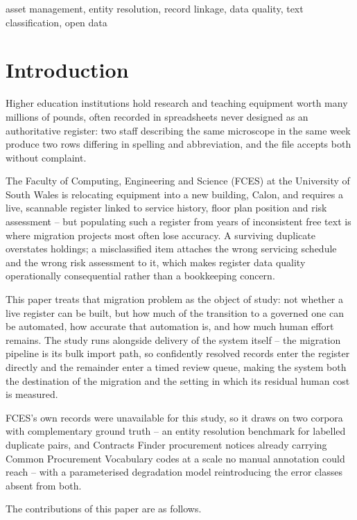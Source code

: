 \documentclass[conference]{IEEEtran}
\begin{document}
\begin{IEEEkeywords}
asset management, entity resolution, record linkage, data quality, text
classification, open data
\end{IEEEkeywords}

\section{Introduction}

Higher education institutions hold research and teaching equipment worth
many millions of pounds, often recorded in spreadsheets never designed as
an authoritative register: two staff describing the same microscope in
the same week produce two rows differing in spelling and abbreviation,
and the file accepts both without complaint.

The Faculty of Computing, Engineering and Science (FCES) at the
University of South Wales is relocating equipment into a new building,
Calon, and requires a live, scannable register linked to service
history, floor plan position and risk assessment -- but populating such
a register from years of inconsistent free text is where migration
projects most often lose accuracy. A surviving duplicate overstates
holdings; a misclassified item attaches the wrong servicing schedule
and the wrong risk assessment to it, which makes register data quality
operationally consequential rather than a bookkeeping concern.

This paper treats that migration problem as the object of study: not
whether a live register can be built, but how much of the transition to
a governed one can be automated, how accurate that automation is, and
how much human effort remains. The study runs alongside delivery of the
system itself -- the migration pipeline is its bulk import path, so
confidently resolved records enter the register directly and the
remainder enter a timed review queue, making the system both the
destination of the migration and the setting in which its residual
human cost is measured.

FCES's own records were unavailable for this study, so it draws on two
corpora with complementary ground truth -- an entity resolution
benchmark for labelled duplicate pairs, and Contracts Finder procurement
notices already carrying Common Procurement Vocabulary codes at a scale
no manual annotation could reach -- with a parameterised degradation
model reintroducing the error classes absent from both.

The contributions of this paper are as follows.
\end{document}

